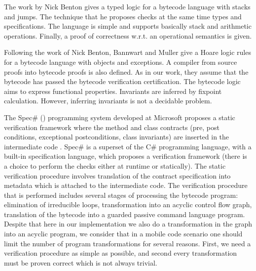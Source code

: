 The work by Nick Benton \cite{B04tlsj} gives a  typed logic for a bytecode language with stacks and jumps. 
The technique that he proposes checks at the same time types and specifications.
The language is simple and supports basically stack and arithmetic operations. Finally, a proof of correctness
w.r.t. an operational semantics is given.

Following the work of Nick Benton, Bannwart and Muller \cite{BM05plb} give  a Hoare logic rules
for a bytecode language with objects and  exceptions. A compiler from source proofs into bytecode proofs is also defined. 
As in our work, they assume that the bytecode has passed the bytecode verification certification. The bytecode logic aims to 
express functional properties. Invariants are inferred by fixpoint calculation.
However, inferring invariants is not a decidable problem.



 The Spec\# (\cite{BLS04sp}) programming system developed at Microsoft proposes a static verification framework where 
 the method and class contracts  (pre, post conditions, exceptional postconditions, class invariants) are inserted in the intermediate code . 
 Spec\# is a superset of the C\# programming language, with a built-in  specification language, 
 which proposes a verification framework (there is a choice to perform the checks either at runtime or statically). 
 The static verification procedure  involves translation of the contract specification into metadata which is attached to the intermediate code. 
 The verification procedure \cite{leinoWPUP} that is performed includes several stages of processing the bytecode program:  
 elimination of irreducible loops, transformation into an acyclic control flow graph,
 translation of the bytecode into a guarded passive command language program. Despite that here in our implementation we also
 do a transformation in the graph into an acyclic program, we consider that in a mobile code scenario
 one should limit the number of program transformations for several reasons.
 First, we need a verification procedure as simple as possible, and second every transformation must be proven correct which is not always trivial.      

